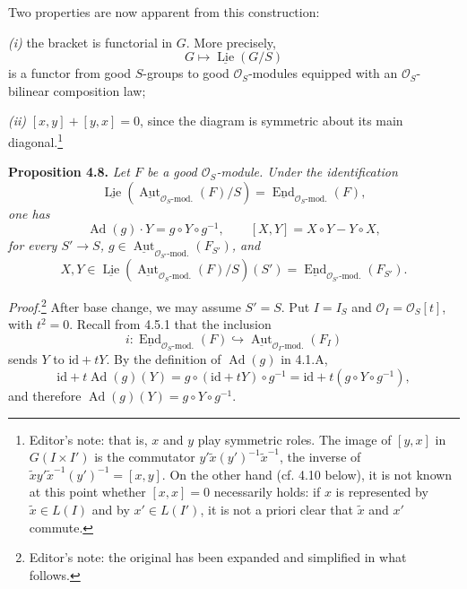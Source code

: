 Two properties are now apparent from this construction:

\textit{(i)} the bracket is functorial in \(G\). More precisely,
\[
 G\longmapsto\underline{\operatorname{Lie}}(G/S)
\]
is a functor from good \(S\)-groups to good \(\mathcal O_S\)-modules
equipped with an \(\mathcal O_S\)-bilinear composition law;

\textit{(ii)} \([x,y]+[y,x]=0\), since the diagram is symmetric about
its main diagonal.\footnote{Editor's note: that is, \(x\) and \(y\)
play symmetric roles. The image of \([y,x]\) in \(G(I\times I')\) is
the commutator
\(y'\widetilde x(y')^{-1}\widetilde x^{-1}\), the inverse of
\(\widetilde x y'\widetilde x^{-1}(y')^{-1}=[x,y]\). On the other
hand (cf. 4.10 below), it is not known at this point whether
\([x,x]=0\) necessarily holds: if \(x\) is represented by
\(\widetilde x\in L(I)\) and by \(x'\in L(I')\), it is not a priori
clear that \(\widetilde x\) and \(x'\) commute.}

\medskip
\noindent\textbf{Proposition 4.8.}
\textit{Let \(F\) be a good \(\mathcal O_S\)-module. Under the
identification}
\[
 \underline{\operatorname{Lie}}\!
  \left(\underline{\operatorname{Aut}}_{\mathcal O_S\text{-mod.}}(F)/S\right)
 =
 \underline{\operatorname{End}}_{\mathcal O_S\text{-mod.}}(F),
\]
\textit{one has}
\[
 \operatorname{Ad}(g)\cdot Y=g\circ Y\circ g^{-1},
 \qquad
 [X,Y]=X\circ Y-Y\circ X,
\]
\textit{for every \(S'\to S\),
\(g\in
\underline{\operatorname{Aut}}_{\mathcal O_{S'}\text{-mod.}}(F_{S'})\),
and}
\[
 X,Y\in
 \underline{\operatorname{Lie}}\!
  \left(\underline{\operatorname{Aut}}_{\mathcal O_S\text{-mod.}}(F)/S\right)
  (S')
 =
 \underline{\operatorname{End}}_{\mathcal O_{S'}\text{-mod.}}(F_{S'}).
\]

\textit{Proof.}\footnote{Editor's note: the original has been expanded
and simplified in what follows.}
After base change, we may assume \(S'=S\). Put \(I=I_S\) and
\(\mathcal O_I=\mathcal O_S[t]\), with \(t^2=0\). Recall from 4.5.1
that the inclusion
\[
 i:\underline{\operatorname{End}}_{\mathcal O_S\text{-mod.}}(F)
 \hookrightarrow
 \underline{\operatorname{Aut}}_{\mathcal O_I\text{-mod.}}(F_I)
\]
sends \(Y\) to \(\mathrm{id}+tY\). By the definition of
\(\operatorname{Ad}(g)\) in 4.1.A,
\[
 \mathrm{id}+t\operatorname{Ad}(g)(Y)
 =g\circ(\mathrm{id}+tY)\circ g^{-1}
 =\mathrm{id}+t(g\circ Y\circ g^{-1}),
\]
and therefore
\(\operatorname{Ad}(g)(Y)=g\circ Y\circ g^{-1}\).

